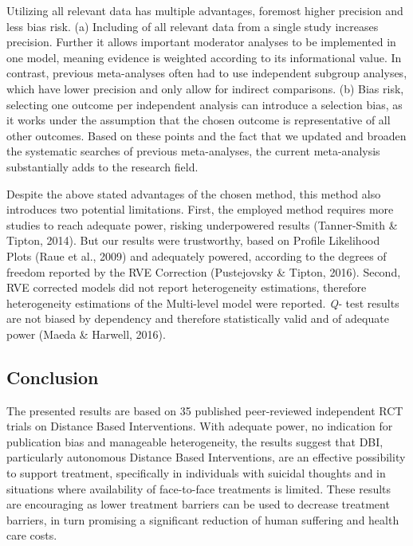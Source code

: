 \documentclass[
  english,
  man]{apa6}
\begin{document}
Utilizing all relevant data has multiple advantages, foremost higher precision and less bias risk. (a) Including of all relevant data from a single study increases precision. Further it allows important moderator analyses to be implemented in one model, meaning evidence is weighted according to its informational value. In contrast, previous meta-analyses often had to use independent subgroup analyses, which have lower precision and only allow for indirect comparisons. (b) Bias risk, selecting one outcome per independent analysis can introduce a selection bias, as it works under the assumption that the chosen outcome is representative of all other outcomes. Based on these points and the fact that we updated and broaden the systematic searches of previous meta-analyses, the current meta-analysis substantially adds to the research field.

Despite the above stated advantages of the chosen method, this method also introduces two potential limitations. First, the employed method requires more studies to reach adequate power, risking underpowered results (Tanner-Smith \& Tipton, 2014). But our results were trustworthy, based on Profile Likelihood Plots (Raue et al., 2009) and adequately powered, according to the degrees of freedom reported by the RVE Correction (Pustejovsky \& Tipton, 2016). Second, RVE corrected models did not report heterogeneity estimations, therefore heterogeneity estimations of the Multi-level model were reported. \emph{Q-} test results are not biased by dependency and therefore statistically valid and of adequate power (Maeda \& Harwell, 2016).

\hypertarget{conclusion}{%
\subsection{Conclusion}\label{conclusion}}

The presented results are based on 35 published peer-reviewed independent RCT trials on Distance Based Interventions. With adequate power, no indication for publication bias and manageable heterogeneity, the results suggest that DBI, particularly autonomous Distance Based Interventions, are an effective possibility to support treatment, specifically in individuals with suicidal thoughts and in situations where availability of face-to-face treatments is limited. These results are encouraging as lower treatment barriers can be used to decrease treatment barriers, in turn promising a significant reduction of human suffering and health care costs.
\end{document}
